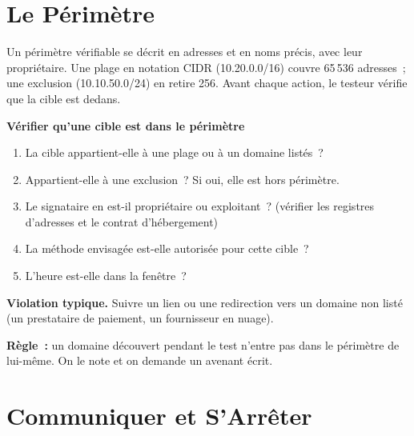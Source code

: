 \section{Le Périmètre}
\label{sec:c03-perimetre}

Un périmètre vérifiable se décrit en adresses et en noms précis, avec leur
propriétaire. Une plage en notation CIDR (10.20.0.0/16) couvre 65\,536
adresses~; une exclusion (10.10.50.0/24) en retire 256. Avant chaque
action, le testeur vérifie que la cible est dedans.

\begin{boxprocedure}
\textbf{Vérifier qu'une cible est dans le périmètre}
\begin{enumerate}
    \item La cible appartient-elle à une plage ou à un domaine listés~?
    \item Appartient-elle à une exclusion~? Si oui, elle est hors périmètre.
    \item Le signataire en est-il propriétaire ou exploitant~? (vérifier les
          registres d'adresses et le contrat d'hébergement)
    \item La méthode envisagée est-elle autorisée pour cette cible~?
    \item L'heure est-elle dans la fenêtre~?
\end{enumerate}
\end{boxprocedure}

\begin{boxalert}
\textbf{Violation typique.} Suivre un lien ou une redirection vers un
domaine non listé (un prestataire de paiement, un fournisseur en nuage).

\smallskip
\textbf{Règle~:} un domaine découvert pendant le test n'entre pas dans le
périmètre de lui-même. On le note et on demande un avenant écrit.
\end{boxalert}

\section{Communiquer et S'Arrêter}
\label{sec:c03-communiquer}


